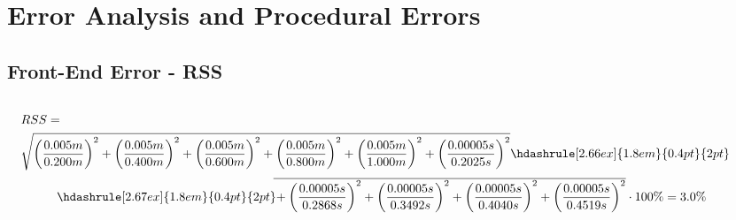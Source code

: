 \chapter{Error Analysis and Procedural Errors}

\section{Front-End Error - RSS}



\begin{fleqn}
\begin{equation*}
  \begin{split}
  \\[-1ex]
      & RSS = \\
      &\begin{multlined}[0.9\linewidth]
      \sqrt{\left( \frac{0.005m}{0.200m} \right)^2 + \left( \frac{0.005m}{0.400m} \right)^2 + \left( \frac{0.005m}{0.600m} \right)^2 + \left( \frac{0.005m}{0.800m} \right)^2 + \left( \frac{0.005m}{1.000m} \right)^2 + \left( \frac{0.00005s}{0.2025s} \right)^2 }\hdashrule[2.66ex]{1.8em}{0.4pt}{2pt} \\[0.5ex]
      {\hdashrule[2.67ex]{1.8em}{0.4pt}{2pt}}\mkern -4mu\overline{\rule{0pt}{2.4ex} + \left( \frac{0.00005s}{0.2868s} \right)^2 + \left( \frac{0.00005s}{0.3492s} \right)^2 + \left( \frac{0.00005s}{0.4040s} \right)^2 + \left( \frac{0.00005s}{0.4519s} \right)^2} \cdot 100\% = 3.0\% \\
      \end{multlined}
  \end{split}
\end{equation*}
\end{fleqn}

